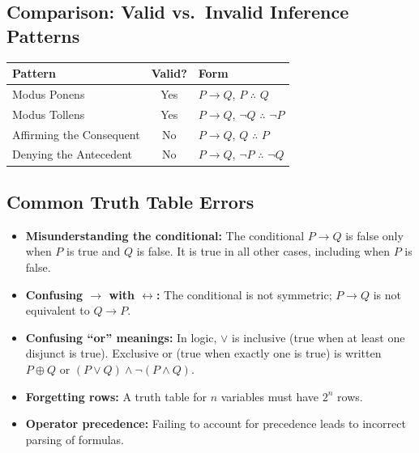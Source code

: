 \subsection{Comparison: Valid vs.\ Invalid Inference Patterns}

\begin{center}
\renewcommand{\arraystretch}{1.3}
\begin{tabular}{|l|c|l|}
\hline
\textbf{Pattern} & \textbf{Valid?} & \textbf{Form} \\
\hline
Modus Ponens & Yes & $P \rightarrow Q$, $P$ $\therefore$ $Q$ \\
Modus Tollens & Yes & $P \rightarrow Q$, $\neg Q$ $\therefore$ $\neg P$ \\
Affirming the Consequent & No & $P \rightarrow Q$, $Q$ $\therefore$ $P$ \\
Denying the Antecedent & No & $P \rightarrow Q$, $\neg P$ $\therefore$ $\neg Q$ \\
\hline
\end{tabular}
\end{center}

\subsection{Common Truth Table Errors}

\begin{remark}
\begin{itemize}
  \item \textbf{Misunderstanding the conditional:} The conditional
        $P \rightarrow Q$ is false only when $P$ is true and $Q$ is false. It is
        true in all other cases, including when $P$ is false.

  \item \textbf{Confusing $\rightarrow$ with $\leftrightarrow$:} The conditional
        is not symmetric; $P \rightarrow Q$ is not equivalent to $Q \rightarrow P$.

  \item \textbf{Confusing ``or'' meanings:} In logic, $\vee$ is inclusive
        (true when at least one disjunct is true). Exclusive or (true when
        exactly one is true) is written $P \oplus Q$ or $(P \vee Q) \wedge \neg(P \wedge Q)$.

  \item \textbf{Forgetting rows:} A truth table for $n$ variables must have
        $2^n$ rows.

  \item \textbf{Operator precedence:} Failing to account for precedence leads
        to incorrect parsing of formulas.
\end{itemize}
\end{remark}

